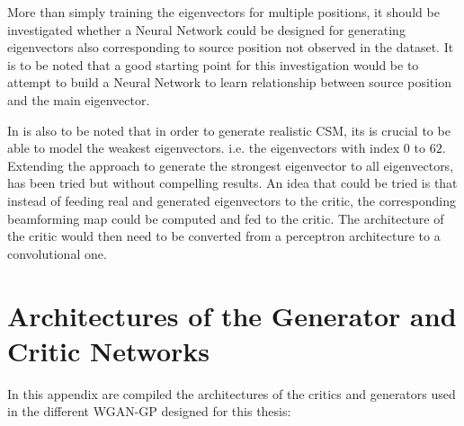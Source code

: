 \documentclass[11pt,a4paper,twoside]{report}
\begin{document}
More than simply training the eigenvectors for multiple positions, it should be investigated whether a Neural Network could be designed for generating eigenvectors also corresponding to source position not observed in the dataset. It is to be noted that a good starting point for this investigation would be to attempt to build a Neural Network to learn relationship between source position and the main eigenvector.

In is also to be noted that in order to generate realistic CSM, its is crucial to be able to model the weakest eigenvectors. i.e. the eigenvectors with index $0$ to $62$. Extending the approach to generate the strongest eigenvector to all eigenvectors, has been tried but without compelling results. An idea that could be tried is that instead of feeding real and generated eigenvectors to the critic, the corresponding beamforming map could be computed and fed to the critic. The architecture of the critic would then need to be converted from a perceptron architecture to a convolutional one. 


\cleardoublepage

\appendix
\fancyhead[LO]{\rightmark}
\fancyhead[RO]{\scshape\appendixname\ \thechapter}
\fancyhead[LE]{\scshape\appendixname\ \thechapter}
\fancyhead[RE]{\textsc{\leftmark}}


\chapter[Architectures of the Different Networks]{Architectures of the Generator and Critic Networks}

In this appendix are compiled the architectures of the critics and generators used in the different WGAN-GP designed for this thesis:
\end{document}
